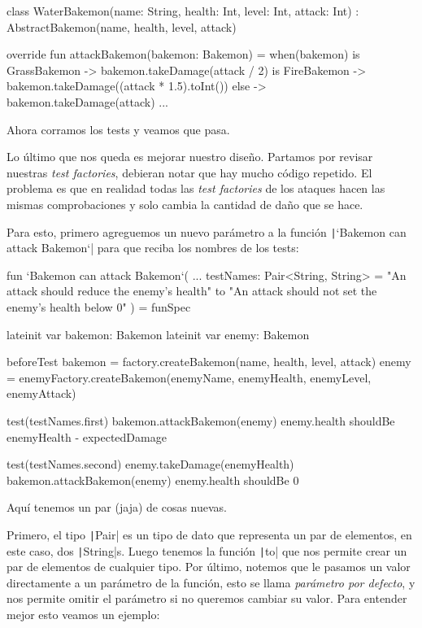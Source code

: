   \begin{kotlin}
    class WaterBakemon(name: String, health: Int, level: Int, attack: Int) :
        AbstractBakemon(name, health, level, attack) {

        override fun attackBakemon(bakemon: Bakemon) = when(bakemon) {
          is GrassBakemon -> bakemon.takeDamage(attack / 2)
          is FireBakemon -> bakemon.takeDamage((attack * 1.5).toInt())
          else -> bakemon.takeDamage(attack)
        }
      ...
    }
  \end{kotlin}

  Ahora corramos los tests y veamos que pasa.
  
  Lo último que nos queda es mejorar nuestro diseño.
  Partamos por revisar nuestras \textit{test factories}, debieran notar que hay mucho código
  repetido.
  El problema es que en realidad todas las \textit{test factories} de los ataques hacen las mismas
  comprobaciones y solo cambia la cantidad de daño que se hace.

  Para esto, primero agreguemos un nuevo parámetro a la función \texttt|`Bakemon can attack 
  Bakemon`| para que reciba los nombres de los tests:

  \begin{kotlin}
    fun `Bakemon can attack Bakemon`(
      ...
      testNames: Pair<String, String> = "An attack should reduce the enemy's health" to
          "An attack should not set the enemy's health below 0"
    ) = funSpec {
      lateinit var bakemon: Bakemon
      lateinit var enemy: Bakemon

      beforeTest {
        bakemon = factory.createBakemon(name, health, level, attack)
        enemy = enemyFactory.createBakemon(enemyName, enemyHealth, enemyLevel, enemyAttack)
      }

      test(testNames.first) {
        bakemon.attackBakemon(enemy)
        enemy.health shouldBe enemyHealth - expectedDamage
      }

      test(testNames.second) {
        enemy.takeDamage(enemyHealth)
        bakemon.attackBakemon(enemy)
        enemy.health shouldBe 0
      }
    }
  \end{kotlin}

  Aquí tenemos un par (jaja) de cosas nuevas.

  Primero, el tipo \texttt|Pair| es un tipo de dato que representa un par de elementos,
  en este caso, dos \texttt|String|s.
  Luego tenemos la función \texttt|to| que nos permite crear un par de elementos
  de cualquier tipo.
  Por último, notemos que le pasamos un valor directamente a un parámetro de la función, esto se 
  llama \textit{parámetro por defecto}, y nos permite omitir el 
  parámetro si no queremos cambiar su valor.
  Para entender mejor esto veamos un ejemplo:

